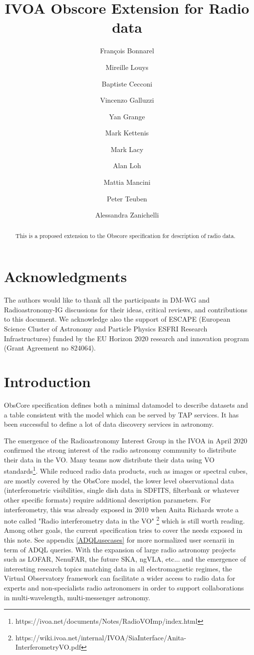 \documentclass[11pt,a4paper]{ivoa}
\title{IVOA Obscore Extension for Radio data}
\author{Fran\c cois Bonnarel}
\author{Mireille Louys}
\author{Baptiste Cecconi}
\author{Vincenzo Galluzzi}
\author{Yan Grange}
\author{Mark Kettenis}
\author{Mark Lacy}
\author{Alan Loh}
\author{Mattia Mancini}
\author{Peter Teuben}
\author{Alessandra Zanichelli}
\begin{document}
\begin{abstract}
This is a proposed extension to the Obscore specification for description of radio data.
\end{abstract}

\section*{Acknowledgments}

The authors would like to thank all the participants in DM-WG and Radioastronomy-IG discussions
for their ideas, critical reviews, and contributions to this document.
We acknowledge also the support of  ESCAPE (European Science Cluster of Astronomy
and Particle Physics ESFRI Research Infrastructures) funded by the EU Horizon
2020 research and innovation program (Grant Agreement no 824064).

\section{Introduction}


ObsCore specification \citep{2017ivoa.spec.0509L} defines both a minimal datamodel to describe datasets
and a table consistent with the model which can be served by TAP services. It has been successful
to define a lot of data discovery services in astronomy.

The emergence  of  the Radioastronomy Interest Group in the IVOA in April 2020 confirmed the strong
interest of the radio astronomy community to distribute their data in the VO. Many teams now
distribute their data using VO standards\footnote{https://ivoa.net/documents/Notes/RadioVOImp/index.html}.
While reduced radio data products, such as images or spectral cubes,%
are mostly covered by the ObsCore model, the lower level observational data
(interferometric visibilities, single dish data in SDFITS, filterbank or whatever other specific formats) require additional description parameters. For interferometry, this was already exposed
in 2010 when Anita Richards wrote a note called "Radio interferometry data in the VO"
\footnote{https://wiki.ivoa.net/internal/IVOA/SiaInterface/Anita-InterferometryVO.pdf} which is
still worth reading. Among other goals, the current specification tries to cover the needs exposed in this note. See appendix \ref{ADQLusecases} for more normalized user scenarii in term of ADQL queries.
With the expansion of large radio astronomy projects such as LOFAR, NenuFAR, the future SKA, ngVLA, etc...
and the emergence of interesting research topics matching data in all electromagnetic regimes, the
Virtual Observatory framework can facilitate a wider access to radio data for experts and
non-specialists radio astronomers in order to support collaborations in multi-wavelength,
multi-messenger astronomy.
\end{document}
